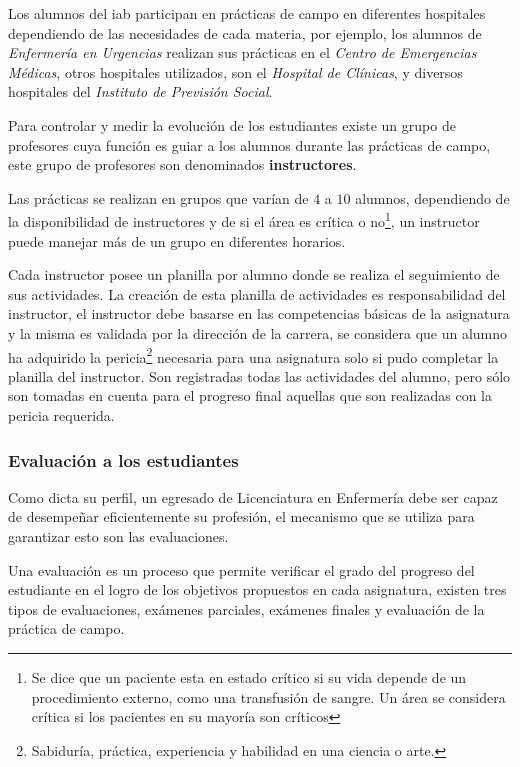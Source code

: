 Los alumnos del \Gls{iab} participan en prácticas de campo 
en diferentes hospitales dependiendo de las necesidades de cada
materia, por ejemplo, los alumnos de \textit{Enfermería en Urgencias} realizan
sus prácticas en el \textit{Centro de Emergencias Médicas}, otros hospitales
utilizados, son el \textit{Hospital de Clínicas}, y diversos hospitales del
\textit{Instituto de Previsión Social}.


Para controlar y medir la evolución de los estudiantes existe un grupo de
profesores cuya función es guiar a los alumnos durante las prácticas de campo,
este grupo de profesores son denominados \textbf{instructores}.

Las prácticas se realizan en grupos que varían de $4$ a $10$ alumnos, dependiendo de
la disponibilidad de instructores y de si el área es crítica o no\footnote{Se
dice que un paciente esta en estado crítico si su vida depende de un
procedimiento externo, como una transfusión de sangre. Un área se considera
crítica si los pacientes en su mayoría son críticos}, un instructor puede
manejar más de un grupo en diferentes horarios. 

Cada instructor posee un planilla por alumno donde se realiza el seguimiento de
sus actividades. La creación de esta planilla de actividades es responsabilidad
del instructor, el instructor debe basarse en las competencias básicas de la
asignatura y la misma es validada por la dirección de la carrera, se considera
que un alumno ha adquirido la pericia\footnote{Sabiduría, práctica, experiencia y 
habilidad en una ciencia o arte.} necesaria para una asignatura solo si pudo
completar la planilla del instructor. Son registradas todas
las actividades del alumno, pero sólo son tomadas en cuenta para el progreso final 
aquellas que son realizadas con la pericia requerida.

\subsubsection{Evaluación a los estudiantes}
\label{sec:problema_evaluacion}

Como dicta su perfil, un egresado de Licenciatura en Enfermería 
debe ser capaz de desempeñar eficientemente su
profesión, el mecanismo que se utiliza para garantizar esto son las
evaluaciones.

Una evaluación es un proceso que permite verificar el grado del progreso del
estudiante en el logro de los objetivos propuestos en cada
asignatura\cite{iab:est_enfemeria}, existen tres tipos de evaluaciones, exámenes
parciales, exámenes finales y evaluación de la práctica de campo.

